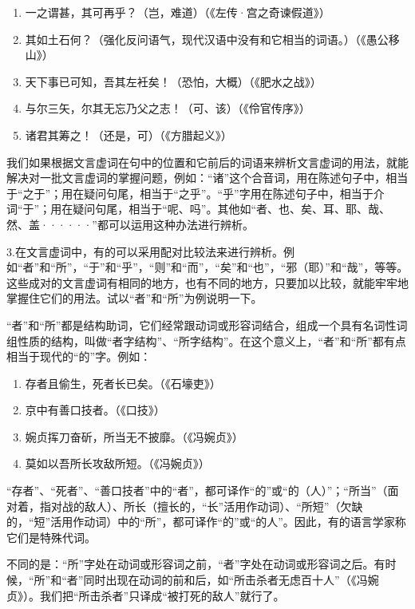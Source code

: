 \begin{enumerate}[label=(\arabic*)]
	\begin{enumerate}[label=\textcircled{\arabic*}]
		\item 一之谓甚，其可再乎？（岂，难道）（《左传·宫之奇谏假道》）
		\item 其如土石何？（强化反问语气，现代汉语中没有和它相当的词语。）（《愚公移山》）
		\item 天下事已可知，吾其左衽矣！（恐怕，大概）（《肥水之战》）
		\item 与尔三矢，尔其无忘乃父之志！（可、该）（《伶官传序》）
		\item 诸君其筹之！（还是，可）（《方腊起义》）
	\end{enumerate}
\end{enumerate}

我们如果根据文言虚词在句中的位置和它前后的词语来辨析文言虚词的用法，就能解决对一批文言虚词的掌握问题，例如：“诸”这个合音词，用在陈述句子中，相当于“之于”；用在疑问句尾，相当于“之乎”。“乎”字用在陈述句子中，相当于介词“于”；用在疑问句尾，相当于“呢、吗”。其他如“者、也、矣、耳、耶、哉、然、盖······”都可以运用这种办法进行辨析。

3.在文言虚词中，有的可以采用配对比较法来进行辨析。例如“者”和“所”，“于”和“乎”，“则”和“而”，“矣”和“也”，“邪（耶）”和“哉”，等等。这些成对的文言虚词有相同的地方，也有不同的地方，只要加以比较，就能牢牢地掌握住它们的用法。试以“者”和“所”为例说明一下。

“者”和“所”都是结构助词，它们经常跟动词或形容词结合，组成一个具有名词性词组性质的结构，叫做“者字结构”、“所字结构”。在这个意义上，“者”和“所”都有点相当于现代的“的”字。例如：
\begin{enumerate}[label=\textcircled{\arabic*}]
	\item 存者且偷生，死者长已矣。（《石壕吏》）
	\item 京中有善口技者。（《口技》）
	\item 婉贞挥刀奋斫，所当无不披靡。（《冯婉贞》）
	\item 莫如以吾所长攻敌所短。（《冯婉贞》）
\end{enumerate}

“存者”、“死者”、“善口技者”中的“者”，都可译作“的”或“的（人）”；“所当”（面对着，指对战的敌人）、所长（擅长的，“长”活用作动词）、“所短”（欠缺的，“短”活用作动词）中的“所”，都可译作“的”或“的人”。因此，有的语言学家称它们是特殊代词。

不同的是：“所”字处在动词或形容词之前，“者”字处在动词或形容词之后。有时候，“所”和“者”同时出现在动词的前和后，如“所击杀者无虑百十人”（《冯婉贞》）。我们把“所击杀者”只译成“被打死的敌人”就行了。

